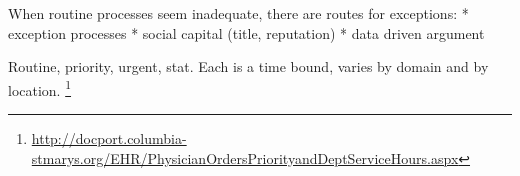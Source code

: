 When routine processes seem inadequate, there are routes for exceptions:
* exception processes
* social capital (title, reputation)
* data driven argument 



Routine, priority, urgent, stat. 
Each is a time bound, varies by domain and by location.
\footnote{\href{http://docport.columbia-stmarys.org/EHR/PhysicianOrdersPriorityandDeptServiceHours.aspx}{http://docport.columbia-stmarys.org/EHR/PhysicianOrdersPriorityandDeptServiceHours.aspx}}